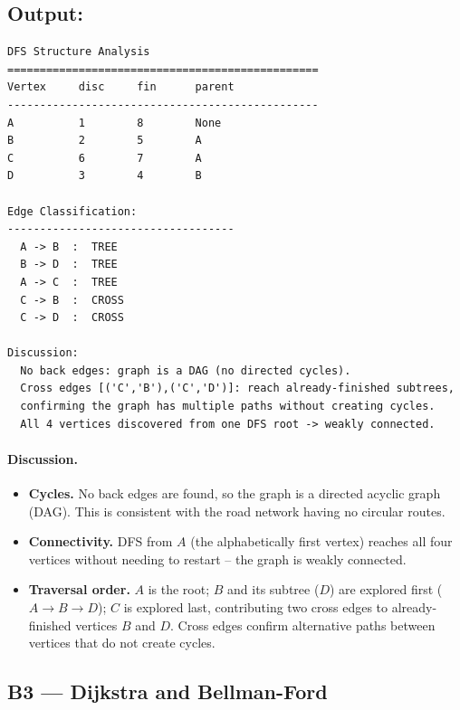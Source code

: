 \documentclass[11pt,a4paper]{article}
\begin{document}
\subsection{Output:}
\begin{lstlisting}[style=output]
DFS Structure Analysis
================================================
Vertex     disc     fin      parent
------------------------------------------------
A          1        8        None
B          2        5        A
C          6        7        A
D          3        4        B

Edge Classification:
-----------------------------------
  A -> B  :  TREE
  B -> D  :  TREE
  A -> C  :  TREE
  C -> B  :  CROSS
  C -> D  :  CROSS

Discussion:
  No back edges: graph is a DAG (no directed cycles).
  Cross edges [('C','B'),('C','D')]: reach already-finished subtrees,
  confirming the graph has multiple paths without creating cycles.
  All 4 vertices discovered from one DFS root -> weakly connected.
\end{lstlisting}

\paragraph{Discussion.}
\begin{itemize}[noitemsep]
  \item \textbf{Cycles.} No back edges are found, so the graph is a directed acyclic graph (DAG). This is consistent with the road network having no circular routes.
  \item \textbf{Connectivity.} DFS from $A$ (the alphabetically first vertex) reaches all four vertices without needing to restart -- the graph is weakly connected.
  \item \textbf{Traversal order.} $A$ is the root; $B$ and its subtree ($D$) are explored first ($A\to B\to D$); $C$ is explored last, contributing two cross edges to already-finished vertices $B$ and $D$. Cross edges confirm alternative paths between vertices that do not create cycles.
\end{itemize}

\subsection{B3 --- Dijkstra and Bellman-Ford}
\end{document}
